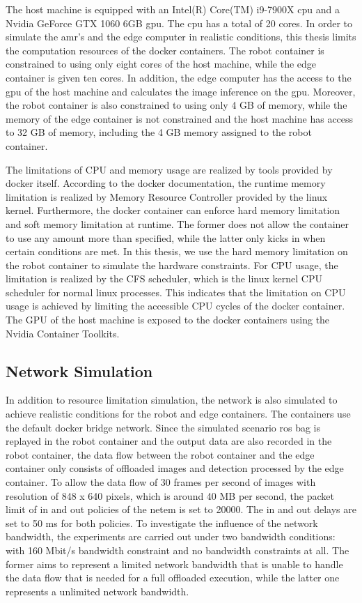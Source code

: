 The host machine is equipped with an Intel(R) Core(TM) i9-7900X \gls{cpu} and a Nvidia GeForce GTX 1060 6GB \gls{gpu}. The \gls{cpu} has a total of 20 cores. In order to simulate the \gls{amr}'s and the edge computer in realistic conditions, this thesis limits the computation resources of the \gls{docker} containers. The robot container is constrained to using only eight cores of the host machine, while the edge container is given ten cores. In addition, the edge computer has the access to the \gls{gpu} of the host machine and calculates the image inference on the \gls{gpu}. Moreover, the robot container is also constrained to using only 4 GB of memory, while the memory of the edge container is not constrained and the host machine has access to 32 GB of memory, including the 4 GB memory assigned to the robot container.

The limitations of CPU and memory usage are realized by tools provided by \gls{docker} itself. According to the \gls{docker} documentation, the runtime memory limitation is realized by Memory Resource Controller provided by the \gls{linux} kernel. Furthermore, the \gls{docker} container can enforce hard memory limitation and soft memory limitation at runtime. The former does not allow the container to use any amount more than specified, while the latter only kicks in when certain conditions are met. In this thesis, we use the hard memory limitation on the robot container to simulate the hardware constraints. For CPU usage, the limitation is realized by the CFS scheduler, which is the \gls{linux} kernel CPU scheduler for normal \gls{linux} processes. This indicates that the limitation on CPU usage is achieved by limiting the accessible CPU cycles of the \gls{docker} container. The GPU of the host machine is exposed to the \gls{docker} containers using the Nvidia Container Toolkits.

\subsection{Network Simulation}

In addition to resource limitation simulation, the network is also simulated to achieve realistic conditions for the robot and edge containers. The containers use the default \gls{docker} bridge network. Since the simulated scenario \gls{ros} bag is replayed in the robot container and the output data are also recorded in the robot container, the data flow between the robot container and the edge container only consists of offloaded images and detection processed by the edge container. To allow the data flow of 30 frames per second of images with resolution of 848 x 640 pixels, which is around 40 MB per second, the packet limit of in and out policies of the \gls{netem} is set to 20000. The in and out delays are set to 50 ms for both policies. To investigate the influence of the network bandwidth, the experiments are carried out under two bandwidth conditions: with 160 Mbit/s bandwidth constraint and no bandwidth constraints at all. The former aims to represent a limited network bandwidth that is unable to handle the data flow that is needed for a full offloaded execution, while the latter one represents a unlimited network bandwidth. 


